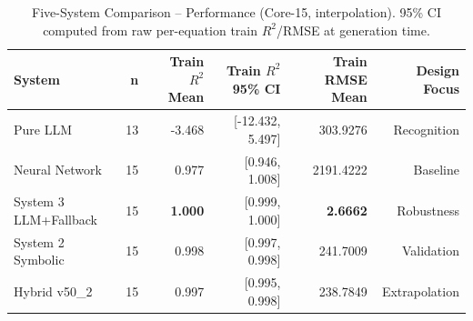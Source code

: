 \documentclass[twoside,11pt]{article}
\begin{document}
\begin{table}[t]
\centering
\caption{Five-System Comparison -- Performance (Core-15, interpolation).
  95\% CI computed from raw per-equation train $R^2$/RMSE at generation time.}
\label{tab:five_systems_performance}
\begin{tabular}{lrrrrr}
\toprule
\textbf{System} & \textbf{n} & \textbf{Train $R^2$ Mean}
  & \textbf{Train $R^2$ 95\% CI} & \textbf{Train RMSE Mean}
  & \textbf{Design Focus} \\
\midrule
Pure LLM & 13 & -3.468 & [-12.432, 5.497] & 303.9276 & Recognition \\
Neural Network & 15 & 0.977 & [0.946, 1.008] & 2191.4222 & Baseline \\
System 3 LLM+Fallback & 15 & \textbf{1.000} & [0.999, 1.000] & \textbf{2.6662} & Robustness \\
System 2 Symbolic & 15 & 0.998 & [0.997, 0.998] & 241.7009 & Validation \\
Hybrid v50\_2 & 15 & 0.997 & [0.995, 0.998] & 238.7849 & Extrapolation \\
\bottomrule
\end{tabular}
\end{table}
\end{document}
